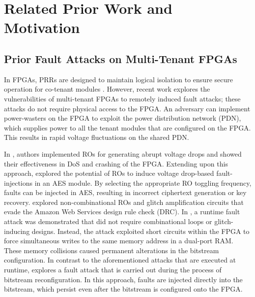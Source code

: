 \section{Related Prior Work and Motivation}
\vspace{-0.1cm}
\subsection{Prior Fault Attacks on Multi-Tenant FPGAs}
\vspace{-0.1cm}

In FPGAs, PRRs are designed to maintain logical isolation to ensure secure operation for co-tenant modules \cite{4223233}.
However, recent work explores the vulnerabilities of multi-tenant FPGAs to remotely induced fault attacks; these attacks do not require physical access to the FPGA. An adversary can implement power-wasters on the FPGA to exploit the power distribution network (PDN), which supplies power to all the tenant modules that are configured on the FPGA. This results in rapid voltage fluctuations on the shared PDN.

In \cite{8056840}, authors implemented ROs for generating abrupt voltage drops and showed their effectiveness in DoS and crashing of the FPGA. Extending upon this approach, \cite{FPGAhammer} explored the potential of ROs to induce voltage drop-based fault-injections in an AES module. By selecting the appropriate RO toggling frequency, faults can be injected in AES, resulting in incorrect ciphertext generation or key recovery. \cite{Sugawara2019OscillatorCentre, provelengios2020power, Krautter2019MitigatingCloud} explored non-combinational ROs and glitch amplification circuits that evade the Amazon Web Services design rule check (DRC).
In \cite{8844478}, a runtime fault attack was demonstrated that did not require combinational loops or glitch-inducing designs. Instead, the attack exploited short circuits within the FPGA to force simultaneous writes to the same memory address in a dual-port RAM. These memory collisions caused permanent alterations in the bitstream configuration. In contrast to the aforementioned attacks that are executed at runtime, \cite{chaudhuri2024hackingfabrictargetingpartial} explores a fault attack that is carried out during the process of bitstream reconfiguration. In this approach, faults are injected directly into the bitstream, which persist even after the bitstream is configured onto the FPGA.

\vspace{-0.1cm}

